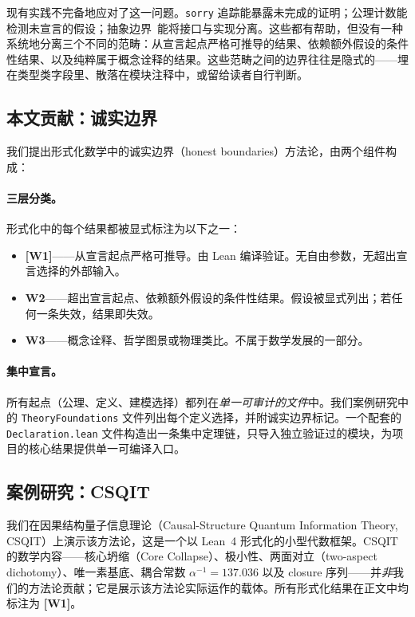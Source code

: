 \documentclass[11pt]{ctexart}
\newcommand{\wone}[1]{\textcolor{wcolor}{\textbf{[#1]}}}
\begin{document}
现有实践不完备地应对了这一问题。\texttt{sorry} 追踪能暴露未完成的证明；公理计数能检测未宣言的假设；抽象边界~\cite{commelin2023}能将接口与实现分离。这些都有帮助，但没有一种系统地分离三个不同的范畴：从宣言起点严格可推导的结果、依赖额外假设的条件性结果、以及纯粹属于概念诠释的结果。这些范畴之间的边界往往是隐式的——埋在类型类字段里、散落在模块注释中，或留给读者自行判断。

\subsection{本文贡献：诚实边界}
我们提出形式化数学中的诚实边界（honest boundaries）方法论，由两个组件构成：

\paragraph{三层分类。}形式化中的每个结果都被显式标注为以下之一：
\begin{itemize}
\item \wone{W1}——从宣言起点严格可推导。由 Lean 编译验证。无自由参数，无超出宣言选择的外部输入。
\item \textbf{W2}——超出宣言起点、依赖额外假设的条件性结果。假设被显式列出；若任何一条失效，结果即失效。
\item \textbf{W3}——概念诠释、哲学图景或物理类比。不属于数学发展的一部分。
\end{itemize}

\paragraph{集中宣言。}所有起点（公理、定义、建模选择）都列在\emph{单一可审计的文件}中。我们案例研究中的 \texttt{TheoryFoundations} 文件列出每个定义选择，并附诚实边界标记。一个配套的 \texttt{Declaration.lean} 文件构造出一条集中定理链，只导入独立验证过的模块，为项目的核心结果提供单一可编译入口。

\subsection{案例研究：CSQIT}
我们在因果结构量子信息理论（Causal-Structure Quantum Information Theory, CSQIT）上演示该方法论，这是一个以 Lean~4 形式化的小型代数框架。CSQIT 的数学内容——核心坍缩（Core Collapse）、极小性、两面对立（two-aspect dichotomy）、唯一素基底、耦合常数 $\alpha^{-1} = 137.036$ 以及 closure 序列——并\emph{非}我们的方法论贡献；它是展示该方法论实际运作的载体。所有形式化结果在正文中均标注为 \wone{W1}。
\end{document}

